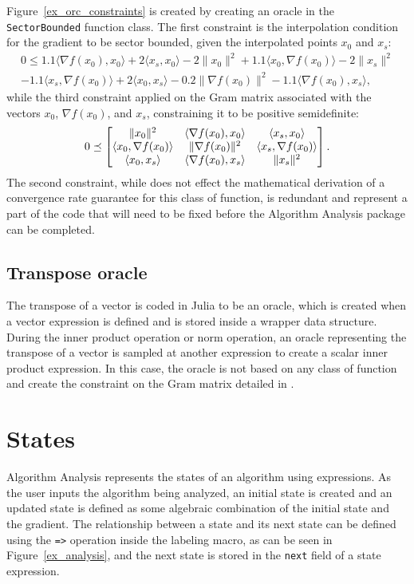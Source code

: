Figure~\ref{ex_orc_constraints} is created by creating an oracle in the \texttt{SectorBounded} function class. The first constraint is the interpolation condition for the gradient to be sector bounded, given the interpolated points $x_0$ and $x_s$:
\begin{multline*}
	0 \leq 1.1\langle \nabla f(x_0),x_0\rangle + 2 \langle x_s,x_0\rangle - 2 \|x_0\|^2 + 1.1\langle x_0,\nabla f(x_0)\rangle - 2\|x_s\|^2 \\
	- 1.1\langle x_s,\nabla f(x_0)\rangle + 2 \langle x_0,x_s\rangle - 0.2 \|\nabla f(x_0)\|^2 - 1.1\langle \nabla f(x_0),x_s\rangle,
\end{multline*}
while the third constraint applied on the Gram matrix associated with the vectors $x_0$, $\nabla f(x_0)$, and $x_s$, constraining it to be positive semidefinite:
\[
	0 \preceq \begin{bmatrix}\|x_0\|^2 & \langle \nabla f(x_0),x_0\rangle & \langle x_s,x_0\rangle \\ \langle x_0,\nabla f(x_0)\rangle & \|\nabla f(x_0)\|^2 & \langle x_s,\nabla f(x_0)\rangle \\ \langle x_0,x_s\rangle & \langle\nabla f(x_0),x_s\rangle & \|x_s\|^2\end{bmatrix}.
\]
The second constraint, while does not effect the mathematical derivation of a convergence rate guarantee for this class of function, is redundant and represent a part of the code that will need to be fixed before the Algorithm Analysis package can be completed.

\subsection*{Transpose oracle}

The transpose of a vector is coded in Julia to be an oracle, which is created when a vector expression is defined and is stored inside a wrapper data structure. During the inner product operation or norm operation, an oracle representing the transpose of a vector is sampled at another expression to create a scalar inner product expression. In this case, the oracle is not based on any class of function and create the constraint on the Gram matrix detailed in \texttt{}.

\section{States} \label{states}
Algorithm Analysis represents the states of an algorithm using expressions. As the user inputs the algorithm being analyzed, an initial state is created and an updated state is defined as some algebraic combination of the initial state and the gradient. The relationship between a state and its next state can be defined using the \texttt{=>} operation inside the labeling macro, as can be seen in Figure~\ref{ex_analysis}, and the next state is stored in the \texttt{next} field of a state expression.

